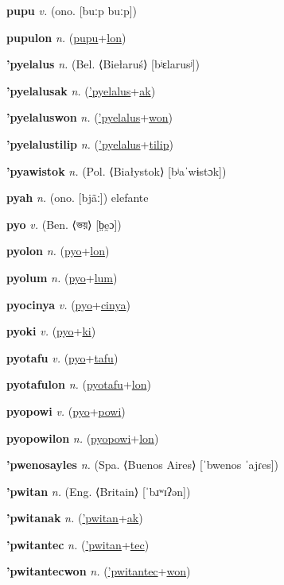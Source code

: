 \textbf{\hypertarget{pupu}{pupu}} \textit{v.} (ono. [buːp buːp])


\textbf{\hypertarget{pupulon}{pupulon}} \textit{n.} (\hyperlink{pupu}{pupu}+\allowbreak \hyperlink{lon}{lon})


\textbf{\hypertarget{'pyelalus}{'pyelalus}} \textit{n.} (Bel. ⟨Biełaruś⟩ [bʲɛlarusʲ])


\textbf{\hypertarget{'pyelalusak}{'pyelalusak}} \textit{n.} (\hyperlink{'pyelalus}{'pyelalus}+\allowbreak \hyperlink{ak}{ak})


\textbf{\hypertarget{'pyelaluswon}{'pyelaluswon}} \textit{n.} (\hyperlink{'pyelalus}{'pyelalus}+\allowbreak \hyperlink{won}{won})


\textbf{\hypertarget{'pyelalustilip}{'pyelalustilip}} \textit{n.} (\hyperlink{'pyelalus}{'pyelalus}+\allowbreak \hyperlink{tilip}{tilip})


\textbf{\hypertarget{'pyawistok}{'pyawistok}} \textit{n.} (Pol. ⟨Białystok⟩ [bʲaˈwɨstɔk])


\textbf{\hypertarget{pyah}{pyah}} \textit{n.} (ono. [bjãː])
elefante

\textbf{\hypertarget{pyo}{pyo}} \textit{v.} (Ben. ⟨{\bengali{}ভয়}⟩ [b̤e̯ɔ])


\textbf{\hypertarget{pyolon}{pyolon}} \textit{n.} (\hyperlink{pyo}{pyo}+\allowbreak \hyperlink{lon}{lon})


\textbf{\hypertarget{pyolum}{pyolum}} \textit{n.} (\hyperlink{pyo}{pyo}+\allowbreak \hyperlink{lum}{lum})


\textbf{\hypertarget{pyocinya}{pyocinya}} \textit{v.} (\hyperlink{pyo}{pyo}+\allowbreak \hyperlink{cinya}{cinya})


\textbf{\hypertarget{pyoki}{pyoki}} \textit{v.} (\hyperlink{pyo}{pyo}+\allowbreak \hyperlink{ki}{ki})


\textbf{\hypertarget{pyotafu}{pyotafu}} \textit{v.} (\hyperlink{pyo}{pyo}+\allowbreak \hyperlink{tafu}{tafu})


\textbf{\hypertarget{pyotafulon}{pyotafulon}} \textit{n.} (\hyperlink{pyotafu}{pyotafu}+\allowbreak \hyperlink{lon}{lon})


\textbf{\hypertarget{pyopowi}{pyopowi}} \textit{v.} (\hyperlink{pyo}{pyo}+\allowbreak \hyperlink{powi}{powi})


\textbf{\hypertarget{pyopowilon}{pyopowilon}} \textit{n.} (\hyperlink{pyopowi}{pyopowi}+\allowbreak \hyperlink{lon}{lon})


\textbf{\hypertarget{'pwenosayles}{'pwenosayles}} \textit{n.} (Spa. ⟨Buenos Aires⟩ [ˈbwenos ˈajɾes])


\textbf{\hypertarget{'pwitan}{'pwitan}} \textit{n.} (Eng. ⟨Britain⟩ [ˈbɹʷɪʔən])


\textbf{\hypertarget{'pwitanak}{'pwitanak}} \textit{n.} (\hyperlink{'pwitan}{'pwitan}+\allowbreak \hyperlink{ak}{ak})


\textbf{\hypertarget{'pwitantec}{'pwitantec}} \textit{n.} (\hyperlink{'pwitan}{'pwitan}+\allowbreak \hyperlink{tec}{tec})


\textbf{\hypertarget{'pwitantecwon}{'pwitantecwon}} \textit{n.} (\hyperlink{'pwitantec}{'pwitantec}+\allowbreak \hyperlink{won}{won})


